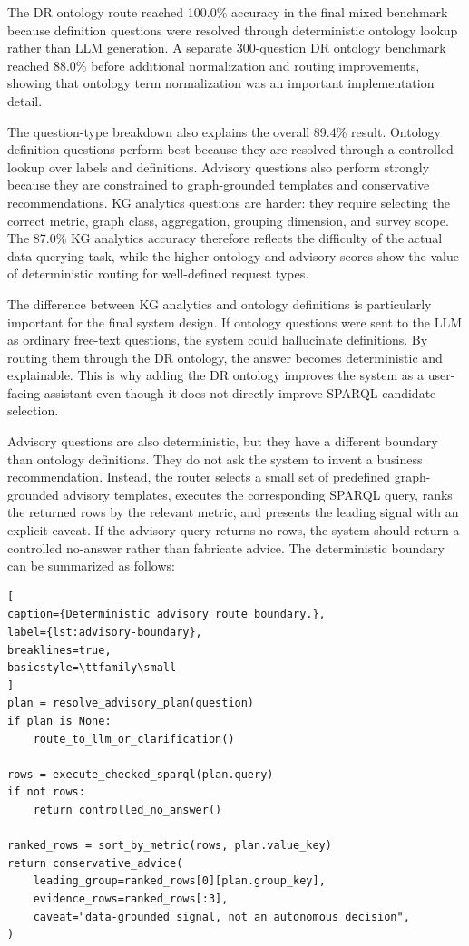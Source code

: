 \documentclass[
  12pt,
  english,
  oneside]{report}
\begin{document}
The DR ontology route reached 100.0\% accuracy in the final mixed benchmark because definition questions were resolved through deterministic ontology lookup rather than LLM generation. A separate 300-question DR ontology benchmark reached 88.0\% before additional normalization and routing improvements, showing that ontology term normalization was an important implementation detail.

The question-type breakdown also explains the overall 89.4\% result. Ontology definition questions perform best because they are resolved through a controlled lookup over labels and definitions. Advisory questions also perform strongly because they are constrained to graph-grounded templates and conservative recommendations. KG analytics questions are harder: they require selecting the correct metric, graph class, aggregation, grouping dimension, and survey scope. The 87.0\% KG analytics accuracy therefore reflects the difficulty of the actual data-querying task, while the higher ontology and advisory scores show the value of deterministic routing for well-defined request types.

The difference between KG analytics and ontology definitions is particularly important for the final system design. If ontology questions were sent to the LLM as ordinary free-text questions, the system could hallucinate definitions. By routing them through the DR ontology, the answer becomes deterministic and explainable. This is why adding the DR ontology improves the system as a user-facing assistant even though it does not directly improve SPARQL candidate selection.

Advisory questions are also deterministic, but they have a different boundary than ontology definitions. They do not ask the system to invent a business recommendation. Instead, the router selects a small set of predefined graph-grounded advisory templates, executes the corresponding SPARQL query, ranks the returned rows by the relevant metric, and presents the leading signal with an explicit caveat. If the advisory query returns no rows, the system should return a controlled no-answer rather than fabricate advice. The deterministic boundary can be summarized as follows:

\begin{lstlisting}[
caption={Deterministic advisory route boundary.},
label={lst:advisory-boundary},
breaklines=true,
basicstyle=\ttfamily\small
]
plan = resolve_advisory_plan(question)
if plan is None:
    route_to_llm_or_clarification()

rows = execute_checked_sparql(plan.query)
if not rows:
    return controlled_no_answer()

ranked_rows = sort_by_metric(rows, plan.value_key)
return conservative_advice(
    leading_group=ranked_rows[0][plan.group_key],
    evidence_rows=ranked_rows[:3],
    caveat="data-grounded signal, not an autonomous decision",
)
\end{lstlisting}
\end{document}
